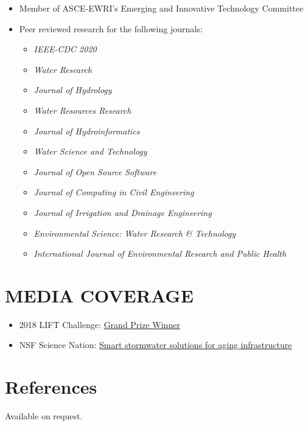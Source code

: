 \documentclass{my_cv}
\begin{document}
\begin{itemize}
	\item Member of ASCE-EWRI's Emerging and Innovative Technology Committee
	\item Peer reviewed research for the following journals: 
	\begin{itemize}
		\item \textit{IEEE-CDC 2020}
		\item \textit{Water Research}
		\item \textit{Journal of Hydrology}
		\item \textit{Water Resources Research}
		\item \textit{Journal of Hydroinformatics}
		\item \textit{Water Science and Technology}
		\item \textit{Journal of Open Source Software}
		\item \textit{Journal of Computing in Civil Engineering}
		\item \textit{Journal of Irrigation and Drainage Engineering}
		\item \textit{Environmental Science: Water Research \& Technology}
		\item \textit{International Journal of Environmental Research and Public Health}
	\end{itemize}
\end{itemize}

\section*{MEDIA COVERAGE}
\begin{itemize}
	\item 2018 LIFT Challenge: \href{https://cee.engin.umich.edu/stories/joint-u-m-and-glwa-team-wins-inaugural-intelligent-water-challenge/}{Grand Prize Winner}
	\item NSF Science Nation: \href{https://www.youtube.com/watch?v=mStPThxAU08}{Smart stormwater solutions for aging infrastructure}
\end{itemize}

\section*{References}
Available on request. 
\end{document}
